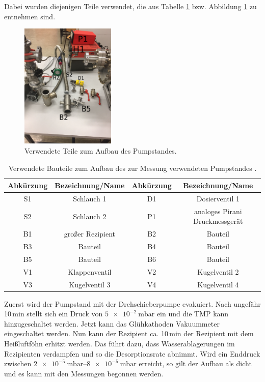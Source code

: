 Dabei wurden diejenigen Teile verwendet, die aus Tabelle \ref{tab:Teile} bzw. Abbildung
\ref{fig:Teile} zu entnehmen sind.

\begin{figure}
  \centering
  \includegraphics[width=0.4\textwidth]{IMG_6891.JPG}
  \caption{Verwendete Teile zum Aufbau des Pumpstandes.}
  \label{fig:Teile}
\end{figure}

\begin{table}
  \caption{Verwendete Bauteile zum Aufbau des zur Messung verwendeten Pumpstandes \cite{anleitung}.}
  \label{tab:Teile}
  \begin{tabular}{c c | c c}
    \toprule
    Abkürzung & Bezeichnung/Name & Abkürzung & Bezeichnung/Name \\
    \midrule
    S1 & Schlauch 1 & D1 & Dosierventil 1 \\
    S2 & Schlauch 2 & P1 & analoges Pirani Druckmessgerät \\
    B1 & großer Rezipient & B2 & Bauteil \\
    B3 & Bauteil & B4 & Bauteil \\
    B5 & Bauteil & B6 & Bauteil \\
    V1 & Klappenventil & V2 & Kugelventil 2 \\
    V3 & Kugelventil 3 & V4 & Kugelventil 4 \\
  \end{tabular}
\end{table}
Zuerst wird der Pumpstand mit der Drehschieberpumpe evakuiert. Nach ungefähr 10$\,$min
stellt sich ein Druck von $\SI{5e-2}{\milli\bar}$ ein und die TMP kann hinzugeschaltet
werden.
Jetzt kann das Glühkathoden Vakuummeter eingeschaltet werden. Nun kann der Rezipient
ca. 10$\,$min der Rezipient mit dem Heißluftföhn erhitzt werden. Das führt dazu,
dass Wasserablagerungen im Rezipienten verdampfen und so die Desorptionsrate abnimmt.
Wird ein Enddruck zwischen $\SIrange{2e-5}{8e-5}{\milli\bar}$ erreicht, so gilt der
Aufbau als dicht und es kann mit den Messungen begonnen werden.

